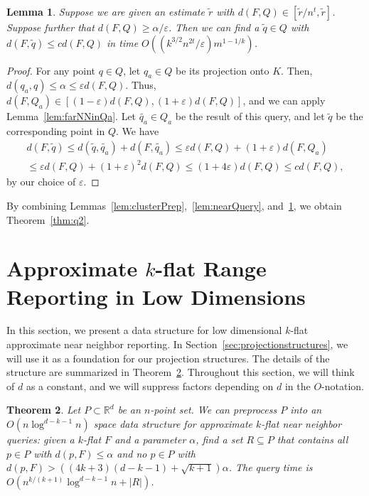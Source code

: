 \documentclass[a4paper,11pt]{paper}
\newcommand{\mathset}[1]{\ensuremath {\mathbb {#1}}}
\newcommand{\eps}{\varepsilon}
\newcommand{\R}{\mathset{R}}
\newcommand{\lowdimapprox}[1][]{(4k+3)(d#1-k-1)+\sqrt{k+1}}
\newtheorem{theorem} {Theorem}[section]
\newtheorem{lemma}[theorem]{Lemma}
\begin{document}
\begin{lemma}\label{lem:farQuery}
  Suppose we are given an estimate $\widetilde{r}$
  with $d(F, Q) \in [\widetilde{r}/n^{t}, \widetilde{r}]$.
  Suppose further that $d(F, Q) \geq \alpha/\eps$.
  Then we can find a $\widetilde{q} \in Q$ with
  $d(F, \widetilde{q}) \leq cd(F, Q)$ in
  time $O((k^{3/2}n^{2t}/\eps)m^{1-1/k})$.
\end{lemma}
\begin{proof}
  For any point $q \in Q$, let $q_a \in Q$ be its projection
  onto $K$. Then, $d(q_a, q) \leq \alpha \leq \eps d(F, Q)$.
  Thus, $d(F, Q_a) \in [(1-\eps)d(F, Q), (1+\eps)d(F, Q)]$,
  and we can apply Lemma~\ref{lem:farNNinQa}. Let
  $\widetilde{q_a} \in Q_a$ be the result of this query, and let
  $\widetilde{q}$ be the corresponding point in $Q$. We have
    \begin{multline*}
    d(F, \widetilde{q}) \leq d(\widetilde{q},
      \widetilde{q_a}) + d(F, \widetilde{q_a})
      \leq \eps d(F, Q) + (1 + \eps)d(F, Q_a)\\
      \leq \eps d(F, Q)+ (1 + \eps)^2d(F, Q)
      \leq (1 + 4\eps) d(F, Q)
      \leq c d(F, Q),
  \end{multline*}
  by our choice of $\eps$.
\end{proof}

By combining Lemmas~\ref{lem:clusterPrep},~\ref{lem:nearQuery},
and~\ref{lem:farQuery}, we obtain Theorem~\ref{thm:q2}.

\section{Approximate $k$-flat Range Reporting in Low Dimensions}
\label{sec:lowdimstructure}

In this section, we present  a data structure for low dimensional
$k$-flat approximate near neighbor reporting.
In Section~\ref{sec:projectionstructures}, we will use it as
a foundation for our projection structures.
The details of the structure are
summarized in Theorem~\ref{thm:lowdimstructure}.
Throughout this section,
we will think of $d$ as a constant, and we will suppress
factors depending on $d$ in the $O$-notation.

\begin{theorem} \label{thm:lowdimstructure}
  Let $P \subset \R^d$ be an $n$-point set.
  We can preprocess $P$ into an $O(n\log^{d-k-1}n)$ space data
  structure for approximate $k$-flat near neighbor queries: given
  a $k$-flat $F$ and a parameter $\alpha$, find a set
  $R \subseteq P$ that contains all $p \in P$ with $d(p,F)
  \leq \alpha$ and no $p \in P$ with
  $d(p,F) > (\lowdimapprox) \alpha$. The
  query time is $O(n^{k/(k+1)}\log^{d-k-1} n + |R|)$.
\end{theorem}
\end{document}
